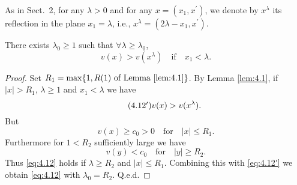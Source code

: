 As in Sect.~2, for any $\lambda>0$ and for any $x =(x_1,x^{\prime})$,
we denote by $x^{\lambda}$ its reflection in the plane $x_1 =\lambda$,
i.e., $x^{\lambda}=(2\lambda-x_1,x^{\prime})$.
\begin{lemma}\label{lem:4.2}
	There exists $\lambda_0\geq 1$ such that $\forall\lambda\geq \lambda_0$,
	\begin{equation}\label{eq:4.12}
		v(x)>v(x^{\lambda}) \quad\text{if}\quad x_1 <\lambda. 
	\end{equation}
\end{lemma}
\begin{proof}
	Set $R_1 =\max \{1,R(1) \text{ of Lemma \eqref{lem:4.1}}\}$. By Lemma \eqref{lem:4.1}, if $|x|>R_1$, $\lambda\geq 1$ and $x_1 <\lambda$ we have
	\begin{equation}\tag{4.12$^{\prime}$}\label{eq:4.12'}
		v(x) > v(x^{\lambda}).
	\end{equation}
	But
	\[ v(x)\geq  c_0>0 \quad\text{for}\quad |x|\leq  R_1. \]
	Furthermore for $1 <R_2$ sufficiently large we have
	\[ v(y)<c_0\quad\text{for}\quad |y|\geq  R_2. \]
	Thus \eqref{eq:4.12} holds if $\lambda\geq  R_2$ and $|x|\leq  R_1$. Combining this with \eqref{eq:4.12'} we obtain \eqref{eq:4.12} with $\lambda_0 =R_2$. Q.e.d.
\end{proof}

